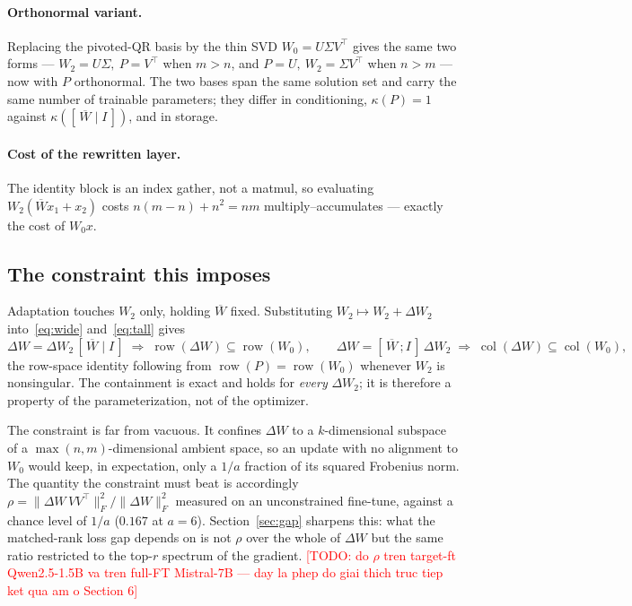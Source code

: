 \documentclass{article}
\theoremstyle{remark}
\newcommand{\TODO}[1]{\textcolor{red}{[TODO: #1]}}
\begin{document}
\paragraph{Orthonormal variant.}
Replacing the pivoted-QR basis by the thin SVD $W_0=U\Sigma V^{\top}$ gives the
same two forms --- $W_2=U\Sigma,\ P=V^{\top}$ when $m>n$, and $P=U,\
W_2=\Sigma V^{\top}$ when $n>m$ --- now with $P$ orthonormal. The two bases span
the same solution set and carry the same number of trainable parameters; they
differ in conditioning, $\kappa(P)=1$ against
$\kappa([\,\overline{W}\mid I\,])$, and in storage.

\paragraph{Cost of the rewritten layer.}
The identity block is an index gather, not a matmul, so evaluating
$W_2(\overline{W}x_1+x_2)$ costs $n(m-n)+n^2=nm$ multiply--accumulates ---
exactly the cost of $W_0x$.

\subsection{The constraint this imposes}
Adaptation touches $W_2$ only, holding $\overline{W}$ fixed. Substituting
$W_2\mapsto W_2+\Delta W_2$ into~\eqref{eq:wide} and~\eqref{eq:tall} gives
\begin{equation}
  \Delta W=\Delta W_2\,[\,\overline{W}\mid I\,]
  \;\Longrightarrow\;
  \operatorname{row}(\Delta W)\subseteq\operatorname{row}(W_0),
  \qquad
  \Delta W=[\,\overline{W}\,;I\,]\,\Delta W_2
  \;\Longrightarrow\;
  \operatorname{col}(\Delta W)\subseteq\operatorname{col}(W_0),
  \label{eq:constraint}
\end{equation}
the row-space identity following from
$\operatorname{row}(P)=\operatorname{row}(W_0)$ whenever $W_2$ is nonsingular.
The containment is exact and holds for \emph{every} $\Delta W_2$; it is
therefore a property of the parameterization, not of the optimizer.

The constraint is far from vacuous. It confines $\Delta W$ to a $k$-dimensional
subspace of a $\max(n,m)$-dimensional ambient space, so an update with no
alignment to $W_0$ would keep, in expectation, only a $1/a$ fraction of its
squared Frobenius norm. The quantity the constraint must beat is accordingly
$\rho=\|\Delta W\,VV^{\top}\|_F^2/\|\Delta W\|_F^2$ measured on an unconstrained
fine-tune, against a chance level of $1/a$ ($0.167$ at $a=6$).
Section~\ref{sec:gap} sharpens this: what the matched-rank loss gap depends on
is not $\rho$ over the whole of $\Delta W$ but the same ratio restricted to the
top-$r$ spectrum of the gradient.
\TODO{do $\rho$ tren target-ft Qwen2.5-1.5B va tren full-FT Mistral-7B — day
la phep do giai thich truc tiep ket qua am o Section 6}
\end{document}

